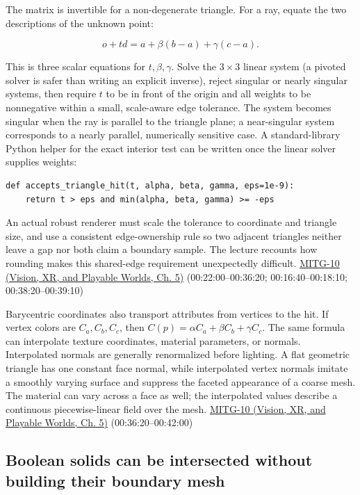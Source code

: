 The matrix is invertible for a non-degenerate triangle. For a ray, equate the two descriptions of the unknown point:

\[
o+td=a+\beta(b-a)+\gamma(c-a).
\]

This is three scalar equations for \(t,\beta,\gamma\). Solve the \(3\times3\) linear system (a pivoted solver is safer than writing an explicit inverse), reject singular or nearly singular systems, then require \(t\) to be in front of the origin and all weights to be nonnegative within a small, scale-aware edge tolerance. The system becomes singular when the ray is parallel to the triangle plane; a near-singular system corresponds to a nearly parallel, numerically sensitive case. A standard-library Python helper for the exact interior test can be written once the linear solver supplies weights:

\begin{verbatim}
def accepts_triangle_hit(t, alpha, beta, gamma, eps=1e-9):
    return t > eps and min(alpha, beta, gamma) >= -eps
\end{verbatim}

An actual robust renderer must scale the tolerance to coordinate and triangle size, and use a consistent edge-ownership rule so two adjacent triangles neither leave a gap nor both claim a boundary sample. The lecture recounts how rounding makes this shared-edge requirement unexpectedly difficult. \href{../07-Vision-XR-and-Playable-Worlds/main.pdf\#nameddest=04-visual-computing-ii-ch036-mitg-10---ray-casting-ii}{MITG-10 (Vision, XR, and Playable Worlds, Ch. 5)} (00:22:00--00:36:20; 00:16:40--00:18:10; 00:38:20--00:39:10)

Barycentric coordinates also transport attributes from vertices to the hit. If vertex colors are \(C_a,C_b,C_c\), then \(C(p)=\alpha C_a+\beta C_b+\gamma C_c\). The same formula can interpolate texture coordinates, material parameters, or normals. Interpolated normals are generally renormalized before lighting. A flat geometric triangle has one constant face normal, while interpolated vertex normals imitate a smoothly varying surface and suppress the faceted appearance of a coarse mesh. The material can vary across a face as well; the interpolated values describe a continuous piecewise-linear field over the mesh. \href{../07-Vision-XR-and-Playable-Worlds/main.pdf\#nameddest=04-visual-computing-ii-ch036-mitg-10---ray-casting-ii}{MITG-10 (Vision, XR, and Playable Worlds, Ch. 5)} (00:36:20--00:42:00)

\subsection{Boolean solids can be intersected without building their boundary mesh}\label{04-visual-computing-ii-ch028-boolean-solids-can-be-intersected-without-building-their-boundary-mesh}

